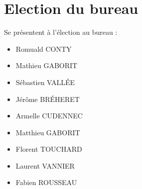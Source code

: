 \documentclass[a4paper, 11pt]{article}
\begin{document}
\section{Election du bureau}

Se présentent à l'élection au bureau :

\begin{itemize}
  \item Romuald CONTY
  \item Mathieu GABORIT
  \item Sébastien VALLÉE
  \item Jérôme BRÉHERET
  \item Armelle CUDENNEC
  \item Matthieu GABORIT
  \item Florent TOUCHARD
  \item Laurent VANNIER
  \item Fabien ROUSSEAU
\end{itemize}
\end{document}
